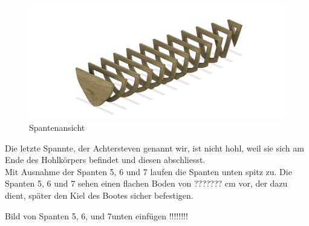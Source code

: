 \begin{figure}[H]
    \centering
    \includegraphics[width=1\linewidth]{assets/rippen_cad.png}
    \caption{Spantenansicht}
    
\end{figure}
Die letzte Spannte, der Achtersteven genannt wir, ist nicht hohl, weil sie sich am Ende des Hohlkörpers befindet und diesen abschliesst.  \\

Mit Ausnahme der Spanten 5, 6 und 7 laufen die Spanten unten spitz zu. Die Spanten 5, 6 und 7 sehen einen flachen Boden von  ??????? cm vor, der dazu dient, später den Kiel des Bootes sicher befestigen. 

Bild von Spanten 5, 6, und 7unten einfügen !!!!!!!!


